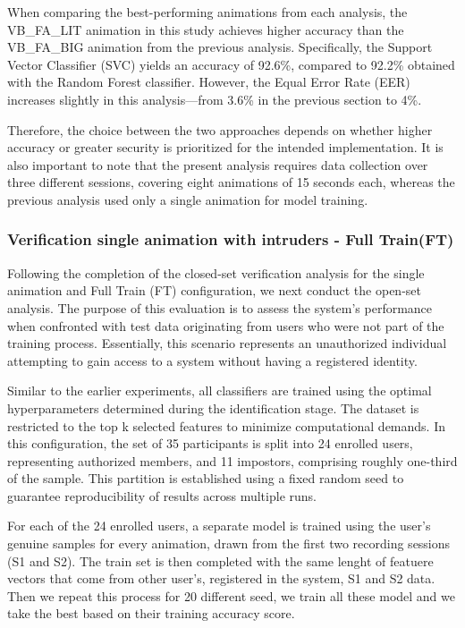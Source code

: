 \documentclass{article}
\begin{document}
When comparing the best-performing animations from each analysis, the VB\_FA\_LIT animation in this study achieves higher accuracy than the VB\_FA\_BIG animation from the previous analysis. 
Specifically, the Support Vector Classifier (SVC) yields an accuracy of 92.6\%, compared to 92.2\% obtained with the Random Forest classifier. 
However, the Equal Error Rate (EER) increases slightly in this analysis—from 3.6\% in the previous section to 4\%.

Therefore, the choice between the two approaches depends on whether higher accuracy or greater security is prioritized for the intended implementation. 
It is also important to note that the present analysis requires data collection over three different sessions, covering eight animations of 15 seconds each, whereas the previous analysis used only a single animation for model training.
\FloatBarrier

\subsubsection{Verification single animation with intruders - Full Train(FT)}
\label{subsec:intruders}

Following the completion of the closed-set verification analysis for the single animation and Full Train (FT) configuration, we next conduct the open-set analysis. 
The purpose of this evaluation is to assess the system’s performance when confronted with test data originating from users who were not part of the training process. 
Essentially, this scenario represents an unauthorized individual attempting to gain access to a system without having a registered identity.

Similar to the earlier experiments, all classifiers are trained using the optimal hyperparameters determined during the identification stage. 
The dataset is restricted to the top k selected features to minimize computational demands. 
In this configuration, the set of 35 participants is split into 24 enrolled users, representing authorized members, and 11 impostors, comprising roughly one-third of the sample. 
This partition is established using a fixed random seed to guarantee reproducibility of results across multiple runs.

For each of the 24 enrolled users, a separate model is trained using the user’s genuine samples for every animation, drawn from the first two recording sessions (S1 and S2).
The train set is then completed with the same lenght of featuere vectors that come from other user's, registered in the system, S1 and S2 data.
Then we repeat this process for 20 different seed, we train all these model and we take the best based on their training accuracy score.
\end{document}
